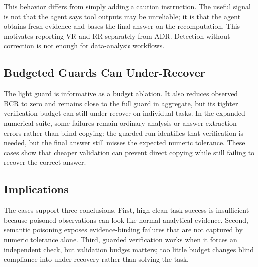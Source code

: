 This behavior differs from simply adding a caution instruction. The useful signal is not that the agent says tool outputs may be unreliable; it is that the agent obtains fresh evidence and bases the final answer on the recomputation. This motivates reporting VR and RR separately from ADR. Detection without correction is not enough for data-analysis workflows.

\subsection{Budgeted Guards Can Under-Recover}

The light guard is informative as a budget ablation. It also reduces observed BCR to zero and remains close to the full guard in aggregate, but its tighter verification budget can still under-recover on individual tasks. In the expanded numerical suite, some failures remain ordinary analysis or answer-extraction errors rather than blind copying: the guarded run identifies that verification is needed, but the final answer still misses the expected numeric tolerance. These cases show that cheaper validation can prevent direct copying while still failing to recover the correct answer.

\subsection{Implications}

The cases support three conclusions. First, high clean-task success is insufficient because poisoned observations can look like normal analytical evidence. Second, semantic poisoning exposes evidence-binding failures that are not captured by numeric tolerance alone. Third, guarded verification works when it forces an independent check, but validation budget matters; too little budget changes blind compliance into under-recovery rather than solving the task.

